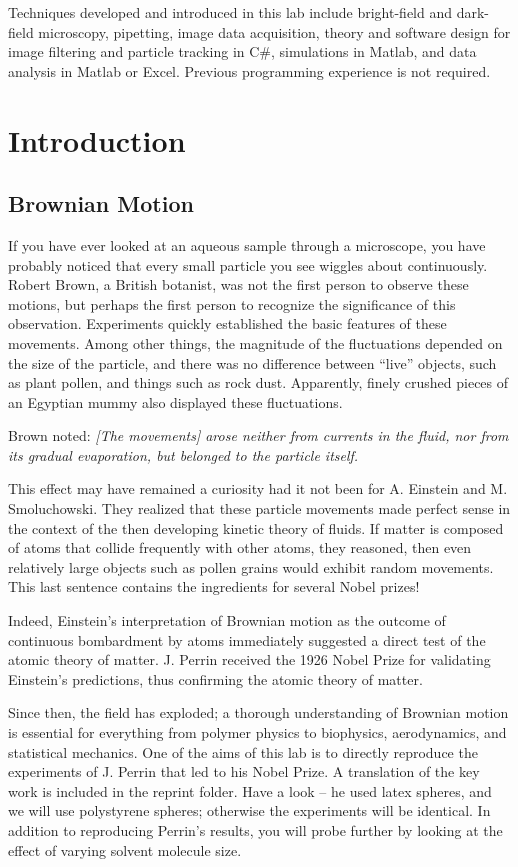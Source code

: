\documentclass{../lab}
\begin{document}
Techniques developed and introduced in this lab include bright-field and dark-field microscopy, pipetting, image data acquisition, theory and software design for image filtering and particle tracking in C\#, simulations in Matlab, and data analysis in Matlab or Excel. Previous programming experience is not required.

\section{Introduction}

\subsection{Brownian Motion}

If you have ever looked at an aqueous sample through a microscope, you have probably noticed that every small particle you see wiggles about continuously. Robert Brown, a British botanist, was not the first person to observe these motions, but perhaps the first person to recognize the significance of this observation. Experiments quickly established the basic features of these movements. Among other things, the magnitude of the fluctuations depended on the size of the particle, and there was no difference between ``live'' objects, such as plant pollen, and things such as rock dust. Apparently, finely crushed pieces of an Egyptian mummy also displayed these fluctuations.

Brown noted: \emph{[The movements] arose neither from currents in the fluid, nor from its gradual evaporation, but belonged to the particle itself.}

This effect may have remained a curiosity had it not been for A. Einstein and M. Smoluchowski. They realized that these particle movements made perfect sense in the context of the then developing kinetic theory of fluids. If matter is composed of atoms that collide frequently with other atoms, they reasoned, then even relatively large objects such as pollen grains would exhibit random movements. This last sentence contains the ingredients for several Nobel prizes!

Indeed, Einstein's interpretation of Brownian motion as the outcome of continuous bombardment by atoms immediately suggested a direct test of the atomic theory of matter. J. Perrin received the 1926 Nobel Prize for validating Einstein's predictions, thus confirming the atomic theory of matter.

Since then, the field has exploded; a thorough understanding of Brownian motion is essential for everything from polymer physics to biophysics, aerodynamics, and statistical mechanics. One of the aims of this lab is to directly reproduce the experiments of J. Perrin that led to his Nobel Prize. A translation of the key work is included in the reprint folder. Have a look – he used latex spheres, and we will use polystyrene spheres; otherwise the experiments will be identical. In addition to reproducing Perrin's results, you will probe further by looking at the effect of varying solvent molecule size.
\end{document}
